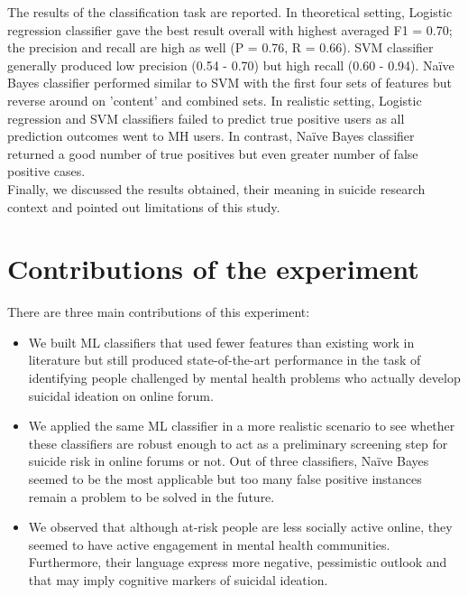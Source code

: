 The results of the classification task are reported. In theoretical setting, Logistic regression classifier gave the best result overall with highest averaged F1 = 0.70; the precision and recall are high as well (P = 0.76, R = 0.66). SVM classifier generally produced low precision (0.54 - 0.70) but high recall (0.60 - 0.94). Na\"ive Bayes classifier performed similar to SVM with the first four sets of features but reverse around on 'content' and combined sets. In realistic setting, Logistic regression and SVM classifiers failed to predict true positive users as all prediction outcomes went to MH users. In contrast, Na\"ive Bayes classifier returned a good number of true positives but even greater number of false positive cases.\\
Finally, we discussed the results obtained, their meaning in suicide research context and pointed out limitations of this study.\\ 
\section{Contributions of the experiment}
There are three main contributions of this experiment:
\begin{itemize}
\item We built ML classifiers that used fewer features than existing work in literature but still produced state-of-the-art performance in the task of identifying people challenged by mental health problems who actually develop suicidal ideation on online forum. 
\item We applied the same ML classifier in a more realistic scenario to see whether these classifiers are robust enough to act as a preliminary screening step for suicide risk in online forums or not. Out of three classifiers, Na\"ive Bayes seemed to be the most applicable but too many false positive instances remain a problem to be solved in the future.
\item We observed that although at-risk people are less socially active online, they seemed to have active engagement in mental health communities. Furthermore, their language express more negative, pessimistic outlook and that may imply cognitive markers of suicidal ideation.
\end{itemize}
